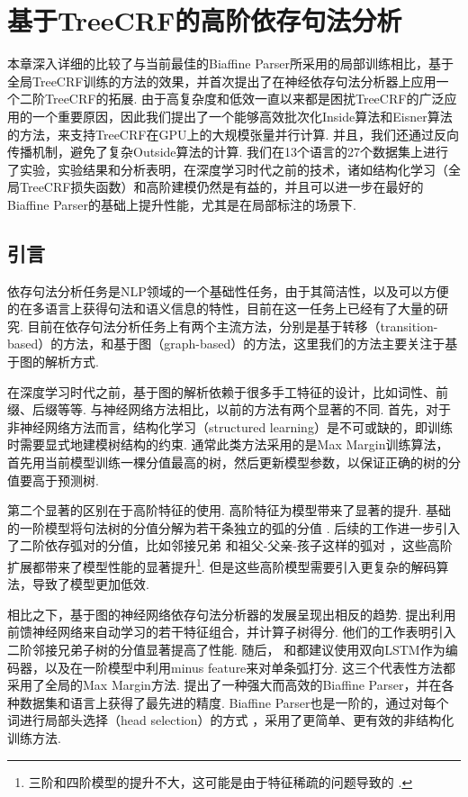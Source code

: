 \chapter{基于TreeCRF的高阶依存句法分析}\label{cha:dep-crf}

本章深入详细的比较了与当前最佳的Biaffine Parser所采用的局部训练相比，基于全局TreeCRF训练的方法的效果，并首次提出了在神经依存句法分析器上应用一个二阶TreeCRF的拓展.
由于高复杂度和低效一直以来都是困扰TreeCRF的广泛应用的一个重要原因，因此我们提出了一个能够高效批次化Inside算法和Eisner算法的方法，来支持TreeCRF在GPU上的大规模张量并行计算.
并且，我们还通过反向传播机制，避免了复杂Outside算法的计算.
我们在13个语言的27个数据集上进行了实验，实验结果和分析表明，在深度学习时代之前的技术，诸如结构化学习（全局TreeCRF损失函数）和高阶建模仍然是有益的，并且可以进一步在最好的Biaffine Parser的基础上提升性能，尤其是在局部标注的场景下.

\section{引言}
依存句法分析任务是NLP领域的一个基础性任务，由于其简洁性，以及可以方便的在多语言上获得句法和语义信息的特性，目前在这一任务上已经有了大量的研究.
目前在依存句法分析任务上有两个主流方法，分别是基于转移（transition-based）的方法，和基于图（graph-based）的方法，这里我们的方法主要关注于基于图的解析方式.

在深度学习时代之前，基于图的解析依赖于很多手工特征的设计，比如词性、前缀、后缀等等.
与神经网络方法相比，以前的方法有两个显著的不同.
首先，对于非神经网络方法而言，结构化学习（structured learning）是不可或缺的，即训练时需要显式地建模树结构的约束.
通常此类方法采用的是Max Margin训练算法，首先用当前模型训练一棵分值最高的树，然后更新模型参数，以保证正确的树的分值要高于预测树.

第二个显著的区别在于高阶特征的使用.
高阶特征为模型带来了显著的提升.
基础的一阶模型将句法树的分值分解为若干条独立的弧的分值 \citep{mcdonald-etal-2005-online}.
后续的工作进一步引入了二阶依存弧对的分值，比如邻接兄弟 \citep{mcdonald-pereira-2006-online}和祖父-父亲-孩子这样的弧对 \citep{carreras-2007-experiments,koo-collins-2010-efficient}，这些高阶扩展都带来了模型性能的显著提升\footnote{三阶和四阶模型的提升不大，这可能是由于特征稀疏的问题导致的 \citep{koo-collins-2010-efficient,ma-zhao-2012-fourth}.}.
但是这些高阶模型需要引入更复杂的解码算法，导致了模型更加低效.

相比之下，基于图的神经网络依存句法分析器的发展呈现出相反的趋势.
\citet{pei-etal-2015-effective}提出利用前馈神经网络来自动学习\citet{chen-manning-2014-fast}的若干特征组合，并计算子树得分.
他们的工作表明引入二阶邻接兄弟子树的分值显著提高了性能.
随后， \citet{wang-chang-2016-graph}和\citet{kiperwasser-goldberg-2016-simple}都建议使用双向LSTM作为编码器，以及在一阶模型中利用minus feature来对单条弧打分.
这三个代表性方法都采用了全局的Max Margin方法.
\citet{dozat-etal-2017-biaffine}提出了一种强大而高效的Biaffine Parser，并在各种数据集和语言上获得了最先进的精度.
Biaffine Parser也是一阶的，通过对每个词进行局部头选择（head selection）的方式 \citep{zhang-etal-2017-head}，采用了更简单、更有效的非结构化训练方法.


